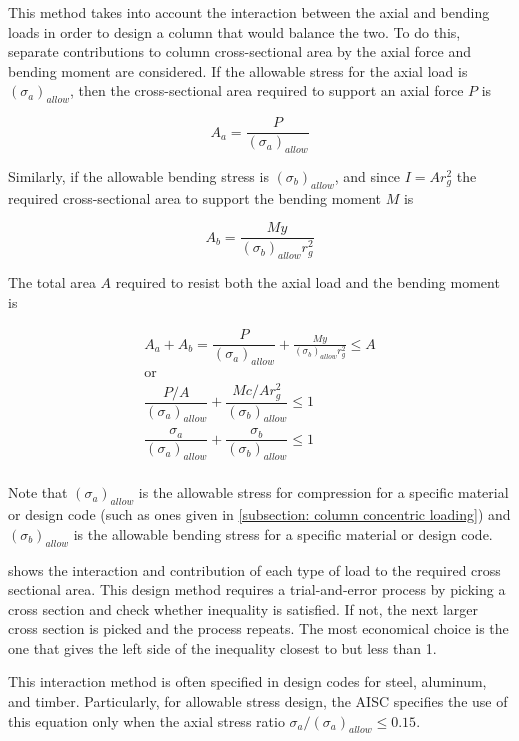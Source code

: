 \documentclass[
10pt,
a4paper,
openany,
svgnames,
]{book}
\begin{document}
This method takes into account the interaction between the axial and bending loads in order to design a column that would balance the two. To do this, separate contributions to column cross-sectional area by the axial force and bending moment are considered. If the allowable stress for the axial load is $(\sigma_a)_{allow}$, then the cross-sectional area required to support an axial force $P$ is

\[A_a = \frac{P}{(\sigma_a)_{allow}}\]

Similarly, if the allowable bending stress is $(\sigma_b)_{allow}$, and since $I = Ar_g^2$ the required cross-sectional area to support the bending moment $M$ is

\[A_b = \frac{My}{(\sigma _b)_{allow}r_g^2}\]

The total area $A$ required to resist both the axial load and the bending moment is

\begin{equation} \label{eqn: interaction formula}
  \begin{gathered}
    A_a + A_b = \dfrac{P}{(\sigma_a)_{allow}} + \frac{My}{(\sigma _b)_{allow}r_g^2} \leqslant A \\ 
    \text{or} \\ 
    \dfrac{P/A}{(\sigma_a)_{allow}} + \dfrac{Mc/Ar_g^2}{(\sigma_b)_{allow}} \leqslant 1 \\ 
    \dfrac{\sigma _a}{(\sigma_a)_{allow}} + \dfrac{\sigma_b}{(\sigma_b)_{allow}} \leqslant 1 \\ 
  \end{gathered}
\end{equation}

Note that $(\sigma_a)_{allow}$ is the allowable stress for compression for a specific material or design code (such as ones given in \cref{subsection: column concentric loading}) and $(\sigma_b)_{allow}$ is the allowable bending stress for a specific material or design code.

 shows the interaction and contribution of each type of load to the required cross sectional area. This design method requires a trial-and-error process by picking a cross section and check whether inequality is satisfied. If not, the next larger cross section is picked and the process repeats. The most economical choice is the one that gives the left side of the inequality closest to but less than 1.

This interaction method is often specified in design codes for steel, aluminum, and timber. Particularly, for allowable stress design, the AISC specifies the use of this equation only when the axial stress ratio $\sigma_a / (\sigma_a)_{allow} \leq 0.15$.
\end{document}
